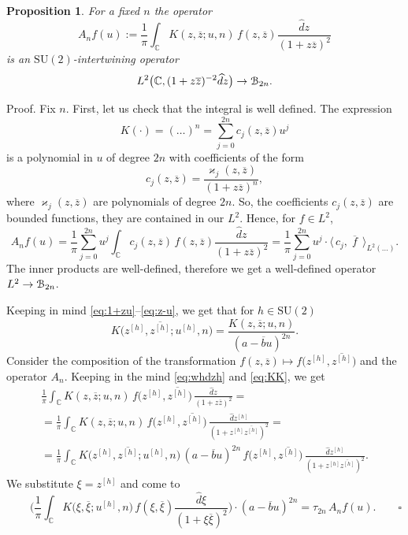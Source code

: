 \documentclass[10pt,a4paper]{amsart}
\newtheorem{proposition}[theorem]{Proposition}
\def\SU{\mathrm {SU}}
\def\kappa{\varkappa}
\def\la{\langle}
\def\ra{\rangle}
\def\cB{\EuScript B}
\def\C {{\mathbb C }}
\def\ov{\overline}
\def\wh{\widehat}
\def\sm{\smallskip}
\begin{document}
\begin{proposition}
\label{pr:intertwiner}
For a fixed $n$ the operator
\begin{equation}
A_n f(u):= \frac1\pi\int_\C K(z, \ov z; u,n)\, 
f(z,\ov z)\frac{\wh d z}{(1+z\ov z)^2}
\label{eq:A-n}
\end{equation}
is an $\SU(2)$-intertwining operator
$$
L^2\bigl(\C,(1+z\ov z)^{-2} \wh d z\bigr)\to \cB_{2n}
.$$
\end{proposition}

{\sc Proof.} Fix $n$.
First, let us check that the integral is well defined. 
 The expression 
$$
K(\cdot)=(\dots)^n=\sum_{j=0}^{2n}
c_j(z,\ov z)  u^j
$$
is a polynomial in $u$ of degree $2n$
with coefficients of the form
$$
c_j(z,\ov z)= \frac{\kappa_j(z,\ov z)}
{(1+z\ov z)^n}
,$$
where $\kappa_j(z,\ov z)$ are polynomials
of degree $2n$. So, the coefficients $c_j(z,\ov z)$
are bounded functions, they are contained in our $L^2$.
Hence, for $f\in L^2$,
$$
A_n f(u)=\frac1\pi\sum_{j=0}^{2n} u^j\int_\C c_j(z,\ov z)\, f(z,\ov z)
\frac{\wh d z}{(1+z\ov z)^2}=\frac1\pi\sum_{j=0}^{2n} u^j\cdot
\bigl\la\, c_j,\ov {\phantom{.}f \phantom{.}}\, \bigr\ra_{L^2(\dots)}.
$$
The inner products are well-defined,  therefore we get a well-defined operator $L^2\to \cB_{2n}$.



\sm

Keeping in  mind \eqref{eq:1+zu}--\eqref{eq:z-u}, we get
that for $h\in\SU(2)$
\begin{equation}
K\bigl(z^{[h]}, \ov {z^{[h]}};u^{[h]},n\bigr)
=\frac{ K(z,\ov z; u,n)}{(a-\ov b u)^{2n}} 
.
\label{eq:KK}
\end{equation}
Consider the composition of the transformation
$f(z,\ov z)\mapsto f\bigl(z^{[h]}, \ov{z^{[h]}}\bigr)$
and the operator $A_n$.
Keeping in the mind   \eqref{eq:whdzh} and \eqref{eq:KK},
we get
\begin{multline*}
\frac1\pi\int_\C K(z,\ov z;u,n)\, f\bigl(z^{[h]}, \ov{z^{[h]}}\bigr)\,
\frac{\wh d z}{(1+z \ov z)^2}
=\\=
\frac1\pi\int_\C K(z,\ov z;u,n)\,f\bigl(z^{[h]}, \ov{z^{[h]}}\bigr)
\,
\frac{\wh d z^{[h]}}{(1+z^{[h]} \ov {z^{[h]}})^2}
=\\=
\frac1\pi\int_\C 
K\bigl(z^{[h]} ,\ov {z^{[h]}} ;u^{[h]} ,n\bigr)\,
(a-\ov b u)^{2n}\,
f\bigl(z^{[h]}, \ov{z^{[h]}}\bigr)\,
\frac{\wh d z^{[h]}}{(1+z^{[h]} \ov {z^{[h]}})^2}.
\end{multline*}
We substitute $\xi=z^{[h]}$ and come to
$$
\qquad
\biggl(\frac1\pi\int_\C 
K\bigl(\xi ,\ov \xi ;u^{[h]} ,n\bigr)\,
f(\xi, \ov \xi)
\frac{\wh d \xi}{(1+\xi \ov \xi)^2}\biggr)
\cdot (a-\ov b u)^{2n}=
\tau_{2n} \, A_n f(u).
\qquad
\square
$$
\end{document}
